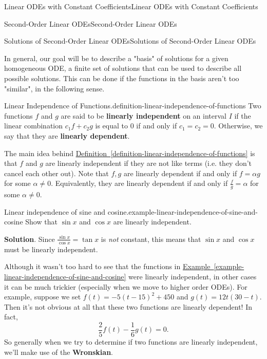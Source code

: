 \documentclass[10pt,]{book}
\newcommand{\terminology}[1]{\textbf{#1}}
\numberwithin{equation}{section}
\begin{document}
\begin{chapterptx}{Linear ODEs with Constant Coefficients}{}{Linear ODEs with Constant Coefficients}{}{}
\begin{sectionptx}{Second-Order Linear ODEs}{}{Second-Order Linear ODEs}{}{}
\begin{subsectionptx}{Solutions of Second-Order Linear ODEs}{}{Solutions of Second-Order Linear ODEs}{}{}
\par
\hypertarget{p-163}{}%
In general, our goal will be to describe a "basis" of solutions for a given homogeneous ODE, a finite set of solutions that can be used to describe all possible solutions. This can be done if the functions in the basis aren't too "similar", in the following sense.%
\begin{definition}{Linear Independence of Functions.}{definition-linear-independence-of-functions}%
\hypertarget{p-164}{}%
Two functions \(f\) and \(g\) are said to be \terminology{linearly independent} on an interval \(I\) if the linear combination \(c_{1}f + c_{2}g\) is equal to \(0\) if and only if \(c_{1} = c_{2} = 0\). Otherwise, we say that they are \terminology{linearly dependent}.%
\end{definition}
\hypertarget{p-165}{}%
The main idea behind \hyperref[definition-linear-independence-of-functions]{Definition~\ref{definition-linear-independence-of-functions}} is that \(f\) and \(g\) are linearly independent if they are not like terms (i.e. they don't cancel each other out). Note that \(f,g\) are linearly dependent if and only if \(f = \alpha g\) for some \(\alpha\neq 0\). Equivalently, they are linearly dependent if and only if \(\frac{f}{g} = \alpha\) for some \(\alpha\neq0\).%
\begin{example}{Linear independence of sine and cosine.}{example-linear-independence-of-sine-and-cosine}%
\hypertarget{p-166}{}%
Show that \(\sin x\) and \(\cos x\) are linearly independent.%
\par\smallskip%
\noindent\textbf{Solution}.\hypertarget{solution-26}{}\quad%
\hypertarget{p-167}{}%
Since \(\frac{\sin x}{\cos x} = \tan x\) is \emph{not} constant, this means that \(\sin x\) and \(\cos x\) must be linearly independent.%
\end{example}
\hypertarget{p-168}{}%
Although it wasn't too hard to see that the functions in \hyperref[example-linear-independence-of-sine-and-cosine]{Example~\ref{example-linear-independence-of-sine-and-cosine}} were linearly independent, in other cases it can be much trickier (especially when we move to higher order ODEs). For example, suppose we set \(f(t) = -5(t-15)^{2} + 450\) and \(g(t) = 12t(30-t)\). Then it's not obvious at all that these two functions are linearly dependent! In fact,%
\begin{equation*}
\frac{2}{5}f(t) - \frac{1}{6}g(t) = 0.
\end{equation*}
So generally when we try to determine if two functions are linearly independent, we'll make use of the \terminology{Wronskian}.%

\end{subsectionptx}
\end{sectionptx}
\end{chapterptx}
\end{document}
